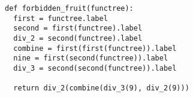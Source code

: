 \documentclass{exam}
\begin{document}
\begin{questions}
\begin{blocksection}
\begin{lstlisting}
\end{lstlisting}

\begin{solution}
\begin{lstlisting}
def forbidden_fruit(functree):
  first = functree.label
  second = first(functree).label
  div_2 = second(functree).label
  combine = first(first(functree)).label
  nine = first(second(functree)).label
  div_3 = second(second(functree)).label

  return div_2(combine(div_3(9), div_2(9)))
\end{lstlisting}    
\end{solution}
\end{blocksection}



\end{questions}
\end{document}
